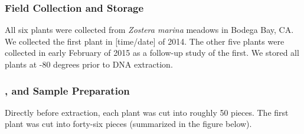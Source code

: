 
\subsubsection{Field Collection and Storage}

All six plants were collected from \textit{Zostera marina} meadows in Bodega Bay, CA. We collected the first plant in [time/date] of 2014. The other five plants were collected in early February of 2015 as a follow-up study of the first. We stored all plants at -80 degrees prior to DNA extraction. 

\subsubsection{, and Sample Preparation}
Directly before extraction, each plant was cut into roughly 50 pieces. The first plant was cut into forty-six pieces (summarized in the figure below). 

